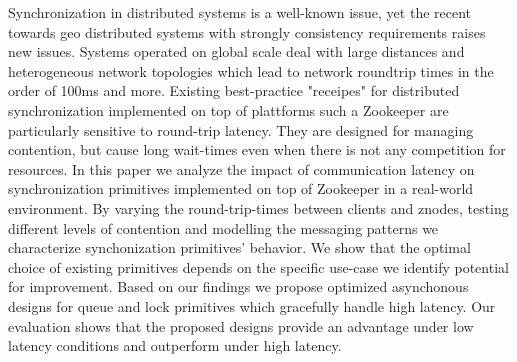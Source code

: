 Synchronization in distributed systems is a well-known issue, yet the recent towards geo distributed systems with strongly consistency requirements raises new issues. Systems operated on global scale deal with large distances and heterogeneous network topologies which lead to network roundtrip times in the order of 100ms and more. Existing best-practice "receipes" for distributed synchronization implemented on top of plattforms such a Zookeeper are particularly sensitive to round-trip latency. They are designed for managing contention, but cause long wait-times even when there is not any competition for resources. In this paper we analyze the impact of communication latency on synchronization primitives implemented on top of Zookeeper in a real-world environment. By varying the round-trip-times between clients and znodes, testing different levels of contention and modelling the messaging patterns we characterize synchonization primitives' behavior. We show that the optimal choice of existing primitives depends on the specific use-case we identify potential for improvement. Based on our findings we propose optimized asynchonous designs for queue and lock primitives which gracefully handle high latency. Our evaluation shows that the proposed designs  provide an advantage under low latency conditions and outperform under high latency.
